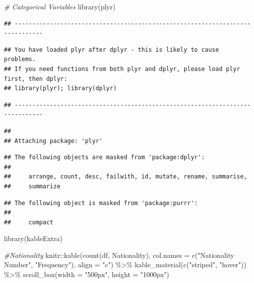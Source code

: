 \documentclass[
]{article}
\newenvironment{Shaded}{\begin{snugshade}}{\end{snugshade}}
\newcommand{\AttributeTok}[1]{\textcolor[rgb]{0.77,0.63,0.00}{#1}}
\newcommand{\CommentTok}[1]{\textcolor[rgb]{0.56,0.35,0.01}{\textit{#1}}}
\newcommand{\FunctionTok}[1]{\textcolor[rgb]{0.00,0.00,0.00}{#1}}
\newcommand{\NormalTok}[1]{#1}
\newcommand{\SpecialCharTok}[1]{\textcolor[rgb]{0.00,0.00,0.00}{#1}}
\newcommand{\StringTok}[1]{\textcolor[rgb]{0.31,0.60,0.02}{#1}}
\begin{document}
\begin{Shaded}
\begin{Highlighting}[]
\CommentTok{\# Categorical Variables}
\FunctionTok{library}\NormalTok{(plyr)}
\end{Highlighting}
\end{Shaded}

\begin{verbatim}
## ------------------------------------------------------------------------------
\end{verbatim}

\begin{verbatim}
## You have loaded plyr after dplyr - this is likely to cause problems.
## If you need functions from both plyr and dplyr, please load plyr first, then dplyr:
## library(plyr); library(dplyr)
\end{verbatim}

\begin{verbatim}
## ------------------------------------------------------------------------------
\end{verbatim}

\begin{verbatim}
## 
## Attaching package: 'plyr'
\end{verbatim}

\begin{verbatim}
## The following objects are masked from 'package:dplyr':
## 
##     arrange, count, desc, failwith, id, mutate, rename, summarise,
##     summarize
\end{verbatim}

\begin{verbatim}
## The following object is masked from 'package:purrr':
## 
##     compact
\end{verbatim}

\begin{Shaded}
\begin{Highlighting}[]
\FunctionTok{library}\NormalTok{(kableExtra)}

\CommentTok{\#Nationality}
\NormalTok{knitr}\SpecialCharTok{::}\FunctionTok{kable}\NormalTok{(}\FunctionTok{count}\NormalTok{(df, }\StringTok{\textquotesingle{}Nationality\textquotesingle{}}\NormalTok{), }\AttributeTok{col.names =} \FunctionTok{c}\NormalTok{(}\StringTok{"Nationality Number"}\NormalTok{, }\StringTok{"Frequency"}\NormalTok{), }\AttributeTok{align =} \StringTok{"c"}\NormalTok{) }\SpecialCharTok{\%\textgreater{}\%}
  \FunctionTok{kable\_material}\NormalTok{(}\FunctionTok{c}\NormalTok{(}\StringTok{"striped"}\NormalTok{, }\StringTok{"hover"}\NormalTok{)) }\SpecialCharTok{\%\textgreater{}\%} 
 \FunctionTok{scroll\_box}\NormalTok{(}\AttributeTok{width =} \StringTok{"500px"}\NormalTok{, }\AttributeTok{height =} \StringTok{"1000px"}\NormalTok{)}
\end{Highlighting}
\end{Shaded}
\end{document}
